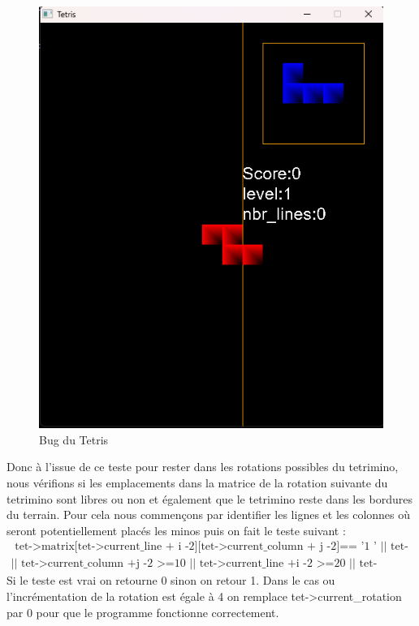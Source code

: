 \documentclass[a4paper,10p]{report}
\begin{document}
\begin{figure}[ht]
\includegraphics[scale=0.5]{CE1.png}
\caption{\label{bug1} Bug du Tetris}
\end{figure}
Donc à l'issue de ce teste pour rester dans les rotations possibles du tetrimino, nous vérifions si les emplacements dans la matrice de la rotation suivante du tetrimino sont libres ou non et également que le tetrimino reste dans les bordures du terrain. Pour cela nous commençons par identifier les lignes et les colonnes où seront potentiellement placés les minos puis on fait le teste suivant :
\begin{equation*}
\begin{split}
    \text{ tet->matrix[tet->current\_line + i -2][tet->current\_column + j -2]== ’1 ’ || tet->
current\_column +j -2 < 0}
\\
\text{|| tet->current\_column +j -2 >=10 || tet->current\_line +i -2 >=20 ||
tet->current\_line +i -2 <0 }
\end{split}
\end{equation*}
Si le teste est vrai on retourne 0 sinon on retour 1. Dans le cas ou l'incrémentation de la rotation est égale à 4 on remplace tet->current\_rotation par 0 pour que le programme fonctionne correctement.
\end{document}
